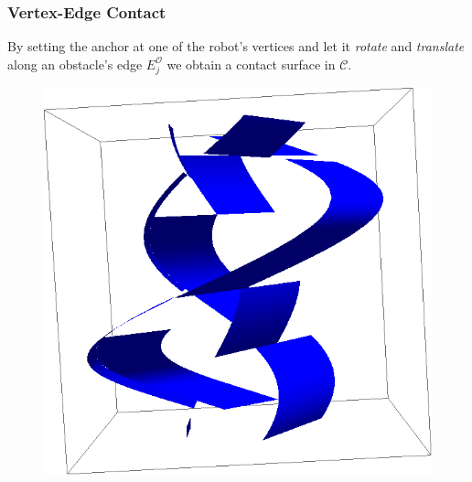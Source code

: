 \documentclass[ucs,9pt,pagenumbersfull]{beamer}
\begin{document}
\begin{frame}
  \frametitle{Vertex-Edge Contact}
  By setting the anchor at one of the robot's vertices and
  let it \emph{rotate} and \emph{translate} along an obstacle's edge
  \(E^{\mathcal{O}}_j\) we obtain a contact surface in
  \(\mathcal{C}\).

  \begin{figure}
    \centering
    \includegraphics[scale=0.3]{Figures/vecc}
  \end{figure}
\end{frame}
\end{document}
